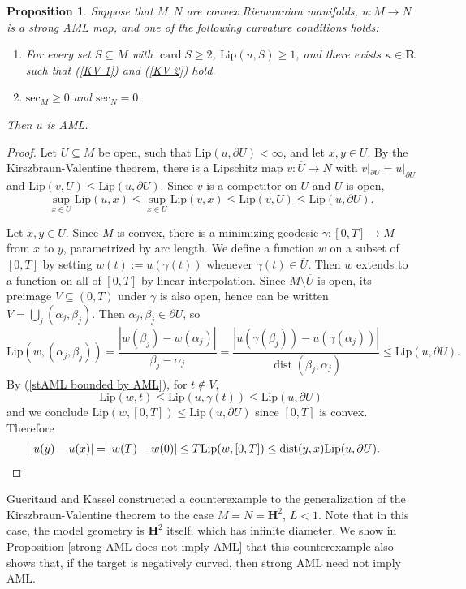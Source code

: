 \documentclass[reqno,11pt]{amsart}
\newcommand{\RR}{\mathbf{R}}
\newcommand{\Hyp}{\mathbf H}
\DeclareMathOperator{\card}{card}
\DeclareMathOperator{\dist}{dist}
\newcommand{\Sec}{\mathrm{sec}}
\newcommand{\Lip}{\mathrm{Lip}}
\newtheorem{proposition}[theorem]{Proposition}
\theoremstyle{definition}
\numberwithin{equation}{section}
\begin{document}
\begin{proposition}
Suppose that $M, N$ are convex Riemannian manifolds, $u: M \to N$ is a strong AML map, and one of the following curvature conditions holds:
\begin{enumerate}
\item For every set $S \subseteq M$ with $\card S \geq 2$, $\Lip(u, S) \geq 1$, and there exists $\kappa \in \RR$ such that (\ref{KV 1}) and (\ref{KV 2}) hold.
\item $\Sec_M \geq 0$ and $\Sec_N = 0$.
\end{enumerate}
Then $u$ is AML.
\end{proposition}
\begin{proof}
Let $U \subseteq M$ be open, such that $\Lip(u, \partial U) < \infty$, and let $x, y \in U$.
By the Kirszbraun-Valentine theorem, there is a Lipschitz map $v: \overline U \to N$ with $v|_{\partial U} = u|_{\partial U}$ and $\Lip(v, U) \leq \Lip(u, \partial U)$.
Since $v$ is a competitor on $U$ and $U$ is open,
\begin{equation}\label{stAML bounded by AML}
\sup_{x \in U} \Lip(u, x) \leq \sup_{x \in U} \Lip(v, x) \leq \Lip(v, U) \leq \Lip(u, \partial U).
\end{equation}

Let $x, y \in U$.
Since $M$ is convex, there is a minimizing geodesic $\gamma: [0, T] \to M$ from $x$ to $y$, parametrized by arc length.
We define a function $w$ on a subset of $[0, T]$ by setting $w(t) := u(\gamma(t))$ whenever $\gamma(t) \in \overline U$.
Then $w$ extends to a function on all of $[0, T]$ by linear interpolation.
Since $M \setminus \overline U$ is open, its preimage $V \subseteq (0, T)$ under $\gamma$ is also open, hence can be written $V = \bigcup_j (\alpha_j, \beta_j)$.
Then $\alpha_j, \beta_j \in \partial U$, so
$$\Lip(w, (\alpha_j, \beta_j)) = \frac{|w(\beta_j) - w(\alpha_j)|}{\beta_j - \alpha_j} = \frac{|u(\gamma(\beta_j)) - u(\gamma(\alpha_j))|}{\dist(\beta_j, \alpha_j)} \leq \Lip(u, \partial U).$$
By (\ref{stAML bounded by AML}), for $t \notin V$,
$$\Lip(w, t) \leq \Lip(u, \gamma(t)) \leq \Lip(u, \partial U)$$
and we conclude $\Lip(w, [0, T]) \leq \Lip(u, \partial U)$ since $[0, T]$ is convex.
Therefore 
\begin{align*}
|u(y) - u(x)| &= |w(T) - w(0)| \leq T \Lip(w, [0, T]) \leq \dist(y, x) \Lip(u, \partial U). \qedhere 
\end{align*}
\end{proof}

Gueritaud and Kassel \cite[Example 9.6]{Gueritaud17} constructed a counterexample to the generalization of the Kirszbraun-Valentine theorem to the case $M = N = \Hyp^2$, $L < 1$.
Note that in this case, the model geometry is $\Hyp^2$ itself, which has infinite diameter.
We show in Proposition \ref{strong AML does not imply AML} that this counterexample also shows that, if the target is negatively curved, then strong AML need not imply AML.
\end{document}
